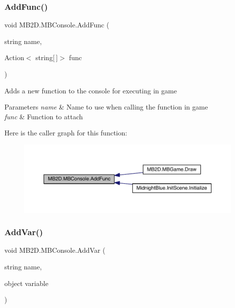 \subsubsection{\texorpdfstring{Add\+Func()}{AddFunc()}}
{\footnotesize\ttfamily void M\+B2\+D.\+M\+B\+Console.\+Add\+Func (\begin{DoxyParamCaption}\item[{string}]{name,  }\item[{Action$<$ string\mbox{[}$\,$\mbox{]}$>$}]{func }\end{DoxyParamCaption})\hspace{0.3cm}{\ttfamily [inline]}}



Adds a new function to the console for executing in game 


\begin{DoxyParams}{Parameters}
{\em name} & Name to use when calling the function in game\\
\hline
{\em func} & Function to attach\\
\hline
\end{DoxyParams}
Here is the caller graph for this function\+:
\nopagebreak
\begin{figure}[H]
\begin{center}
\leavevmode
\includegraphics[width=350pt]{class_m_b2_d_1_1_m_b_console_a3c515ad4a199b0b67049df57fce7cb3f_icgraph}
\end{center}
\end{figure}
\hypertarget{class_m_b2_d_1_1_m_b_console_aeff7888e763a415aeccadc347e09828d}{}\label{class_m_b2_d_1_1_m_b_console_aeff7888e763a415aeccadc347e09828d} 
\subsubsection{\texorpdfstring{Add\+Var()}{AddVar()}}
{\footnotesize\ttfamily void M\+B2\+D.\+M\+B\+Console.\+Add\+Var (\begin{DoxyParamCaption}\item[{string}]{name,  }\item[{object}]{variable }\end{DoxyParamCaption})\hspace{0.3cm}{\ttfamily [inline]}}



